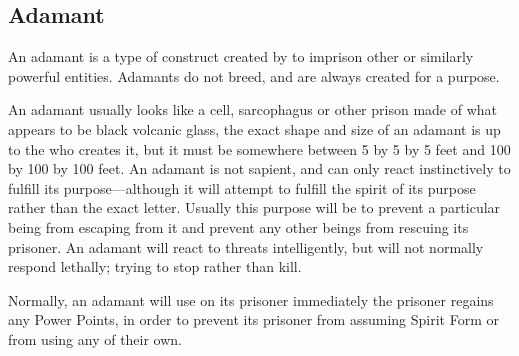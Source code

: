 \begin{multicols*}{2}
\subsection{Adamant}

An adamant is a type of construct created by  to imprison other  or similarly powerful entities. Adamants do not breed, and are always created for a purpose.

An adamant usually looks like a cell, sarcophagus or other prison made of what appears to be black volcanic glass, the exact shape and size of an adamant is up to the  who creates it, but it must be somewhere between 5 by 5 by 5 feet and 100 by 100 by 100 feet. An adamant is not sapient, and can only react instinctively to fulfill its purpose—although it will attempt to fulfill the spirit of its purpose rather than the exact letter. Usually this purpose will be to prevent a particular being from escaping from it and prevent any other beings from rescuing its prisoner. An adamant will react to threats intelligently, but will not normally respond lethally; trying to stop rather than kill.

Normally, an adamant will use  on its prisoner immediately the prisoner regains any Power Points, in order to prevent its prisoner from assuming Spirit Form or from using any  of their own.


\end{multicols*}
